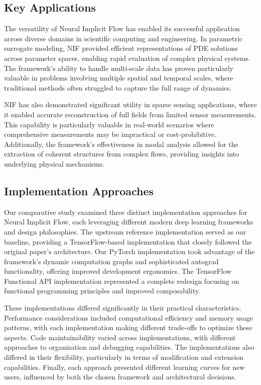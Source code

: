 \documentclass[10pt,journal,compsoc,onecolumn]{IEEEtran}
\begin{document}
\subsection{Key Applications}
The versatility of Neural Implicit Flow has enabled its successful application across diverse domains in scientific computing and engineering. In parametric surrogate modeling, NIF provided efficient representations of PDE solutions across parameter spaces, enabling rapid evaluation of complex physical systems. The framework's ability to handle multi-scale data has proven particularly valuable in problems involving multiple spatial and temporal scales, where traditional methods often struggled to capture the full range of dynamics.

NIF has also demonstrated significant utility in sparse sensing applications, where it enabled accurate reconstruction of full fields from limited sensor measurements. This capability is particularly valuable in real-world scenarios where comprehensive measurements may be impractical or cost-prohibitive. Additionally, the framework's effectiveness in modal analysis allowed for the extraction of coherent structures from complex flows, providing insights into underlying physical mechanisms.

\subsection{Implementation Approaches}
Our comparative study examined three distinct implementation approaches for Neural Implicit Flow, each leveraging different modern deep learning frameworks and design philosophies. The upstream reference implementation served as our baseline, providing a TensorFlow-based implementation that closely followed the original paper's architecture. Our PyTorch implementation took advantage of the framework's dynamic computation graphs and sophisticated autograd functionality, offering improved development ergonomics. The TensorFlow Functional API implementation represented a complete redesign focusing on functional programming principles and improved composability.

These implementations differed significantly in their practical characteristics. Performance considerations included computational efficiency and memory usage patterns, with each implementation making different trade-offs to optimize these aspects. Code maintainability varied across implementations, with different approaches to organization and debugging capabilities. The implementations also differed in their flexibility, particularly in terms of modification and extension capabilities. Finally, each approach presented different learning curves for new users, influenced by both the chosen framework and architectural decisions.
\end{document}
